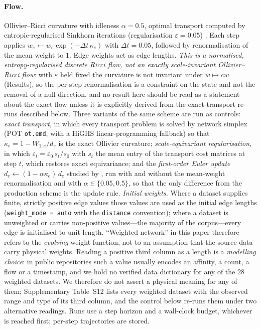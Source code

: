 \documentclass[11pt]{article}
\newcommand{\kappaedge}{\kappa}
\begin{document}
\paragraph{Flow.} Ollivier--Ricci curvature with idleness $\alpha=0.5$,
optimal transport computed by entropic-regularised Sinkhorn iterations
(regularisation $\varepsilon=0.05$)
\cite{Sinkhorn1964,SinkhornKnopp1967,Cuturi2013,PeyreCuturi2019}. Each step applies
$w_e \leftarrow w_e \exp(-\Delta t\, \kappaedge_e)$ with $\Delta t = 0.05$,
followed by renormalisation of the mean weight to $1$. Edge weights act as
edge lengths. \emph{This is a normalised, entropy-regularised discrete Ricci
flow, not an exactly scale-invariant Ollivier--Ricci flow}: with $\varepsilon$
held fixed the curvature is not invariant under $w\mapsto cw$ (Results), so
the per-step renormalisation is a constraint on the state and not the removal
of a null direction, and no result here should be read as a statement about
the exact flow unless it is explicitly derived from the exact-transport
re-runs described below. Three variants of the same scheme are run as
controls: \emph{exact transport}, in which every transport problem is solved
by network simplex (POT \texttt{ot.emd}, with a HiGHS linear-programming
fallback) so that $\kappa_e = 1-W_{1,e}/d_e$ is the exact Ollivier curvature;
\emph{scale-equivariant regularisation}, in which
$\varepsilon_t = \varepsilon_0\, s_t/s_0$ with $s_t$ the mean entry of the
transport cost matrices at step $t$, which restores exact equivariance; and
the \emph{first-order Euler update} $d_e\leftarrow(1-\alpha\kappa_e)\,d_e$
studied by \cite{LiMunch2026}, run with and without the mean-weight
renormalisation and with $\alpha\in\{0.05,0.5\}$, so that the only difference
from the production scheme is the update rule. \emph{Initial weights.} Where
a dataset supplies finite, strictly positive edge values those values are used
as the initial edge lengths (\texttt{weight\_mode = auto} with the
\texttt{distance} convention); where a dataset is unweighted or carries
non-positive values---the majority of the corpus---every edge is initialised to
unit length. ``Weighted network'' in this paper therefore refers to the
\emph{evolving} weight function, not to an assumption that the source data
carry physical weights. Reading a positive third column as a length is a
\emph{modelling choice}: in public repositories such a value usually encodes an
affinity, a count, a flow or a timestamp, and we hold no verified data
dictionary for any of the $28$ weighted datasets. We therefore do not assert a
physical meaning for any of them; Supplementary Table~S12 lists every weighted
dataset with the observed range and type of its third column, and the control
below re-runs them under two alternative readings.
Runs use a step horizon and a wall-clock budget, whichever is reached first;
per-step trajectories are stored.
\end{document}
